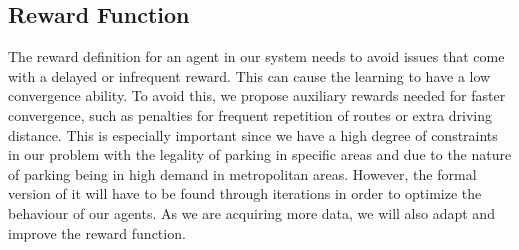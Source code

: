 \subsection{Reward Function}

The reward definition for an agent in our system needs to avoid issues that come with a delayed or infrequent reward. This can cause the learning to have a low convergence ability. To avoid this, we propose auxiliary rewards needed for faster convergence, such as penalties for frequent repetition of routes or extra driving distance. This is especially important since we have a high degree of constraints in our problem with the legality of parking in specific areas and due to the nature of parking being in high demand in metropolitan areas. However, the formal version of it will have to be found through iterations in order to optimize the behaviour of our agents. As we are acquiring more data, we will also adapt and improve the reward function.